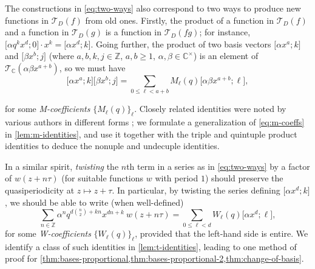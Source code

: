 \documentclass[reqno,11pt]{amsart}
\theoremstyle{definition}
\theoremstyle{remark}
\numberwithin{equation}{section}
\newcommand{\Z}{\mathbb{Z}}
\newcommand{\C}{\mathbb{C}}
\newcommand{\mT}{\mathcal{T}}
\newcommand{\vect}[2]{\big[{#1};{#2}\big]}
\begin{document}
The constructions in \cref{eq:two-ways} also correspond to two ways to produce new functions in $\mT_D(f)$ from old ones. Firstly, the product of a function in $\mT_D(f)$ and a function in $\mT_D(g)$ is a function in $\mT_D(fg)$; for instance, $\vect{\alpha q^k x^d}{0} \cdot x^k = \vect{\alpha x^d}{k}$. %
Going further, the product of two basis vectors $\vect{\alpha x^a}{k}$ and $\vect{\beta x^b}{j}$ (where $a, b, k, j \in \Z$, $a, b \ge 1$, $\alpha, \beta \in \C^\times$) is an element of $\mT_\C\left(\alpha \beta x^{a+b}\right)$, so we must have
\begin{equation}\label{eq:m-coeffs}
    \vect{\alpha x^a}{k}\vect{\beta x^b}{j} = \sum_{0 \le \ell < a+b} M_\ell(q) \vect{\alpha \beta x^{a+b}}{\ell},
\end{equation}

for some \emph{M-coefficients} $\{M_\ell(q)\}_\ell$. Closely related identities were noted by various authors in different forms \cite{chu2007unification,adiga2014identities,yan2009several}; we formulate a generalization of \cref{eq:m-coeffs} in \cref{lem:m-identities}, and use it together with the triple and quintuple product identities to deduce the nonuple and undecuple identities.

In a similar spirit, \emph{twisting} the $n$th term in a series as in \cref{eq:two-ways} by a factor of $w(z + n\tau)$ (for suitable functions $w$ with period $1$) should preserve the quasiperiodicity at $z \mapsto z + \tau$. In particular, by twisting the series defining $\vect{\alpha x^d}{k}$, we should be able to write (when well-defined)
\begin{equation}\label{eq:w-coeffs}
    \sum_{n \in \Z} \alpha^n q^{d\binom{n}{2} + kn} x^{dn+k}\  w(z+ n\tau) = \sum_{0 \le \ell < d} W_\ell(q) \vect{\alpha x^d}{\ell},
\end{equation}
for some \emph{W-coefficients} $\{W_\ell(q)\}_\ell$, provided that the left-hand side is entire. We identify a class of such identities in \cref{lem:t-identities}, leading to one method of proof for \cref{thm:bases-proportional,thm:bases-proportional-2,thm:change-of-basis}.
\end{document}
